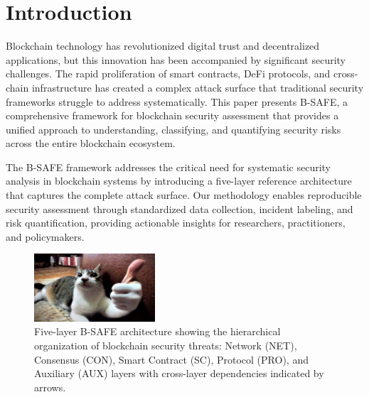 \section{Introduction}
Blockchain technology has revolutionized digital trust and decentralized applications, but this innovation has been accompanied by significant security challenges. The rapid proliferation of smart contracts, DeFi protocols, and cross-chain infrastructure has created a complex attack surface that traditional security frameworks struggle to address systematically. This paper presents B-SAFE, a comprehensive framework for blockchain security assessment that provides a unified approach to understanding, classifying, and quantifying security risks across the entire blockchain ecosystem.

The B-SAFE framework addresses the critical need for systematic security analysis in blockchain systems by introducing a five-layer reference architecture that captures the complete attack surface. Our methodology enables reproducible security assessment through standardized data collection, incident labeling, and risk quantification, providing actionable insights for researchers, practitioners, and policymakers.

\begin{figure}[H]
\centering
\includegraphics[width=0.4\textwidth]{../figure/fig2.png}
\caption{Five-layer B-SAFE architecture showing the hierarchical organization of blockchain security threats: Network (NET), Consensus (CON), Smart Contract (SC), Protocol (PRO), and Auxiliary (AUX) layers with cross-layer dependencies indicated by arrows.}
\label{fig:five_layer_architecture}
\end{figure}